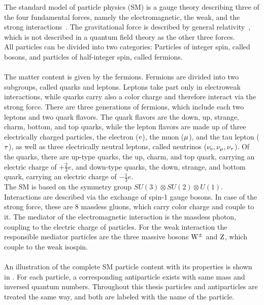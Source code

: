 The standard model of particle physics (SM) is a gauge theory describing three of the four fundamental forces, namely the electromagnetic, the weak, and the strong interactions~\cite{SM}. The gravitational force is described by general relativity~\cite{Einstein}, which is not described in a quantum field theory as the other three forces.\\
All particles can be divided into two categories: Particles of integer spin, called bosons, and particles of half-integer spin, called fermions.\\\\
The matter content is given by the fermions. Fermions are divided into two subgroups, called quarks and leptons. Leptons take part only in electroweak interactions, while quarks carry also a color charge and therefore interact via the strong force. There are three generations of fermions, which include each two leptons and two quark flavors. The quark flavors are the down, up, strange, charm, bottom, and top quarks, while the lepton flavors are made up of three electrically charged particles, the electron ($\mathrm{e}$), the muon ($\mu$), and the tau lepton ($\tau$), as well as three electrically neutral leptons, called neutrinos ($\nu_\mathrm{{e}},\nu_{\mu},\nu_{\tau}$).
Of the quarks, there are up-type quarks, the up, charm, and top quark, carrying an electric charge of $+\frac{2}{3}e$, and down-type quarks, the down, strange, and bottom quark, carrying an electric charge of $-\frac{1}{3}e$.\\
The SM is based on the symmetry group $SU(3)\otimes SU(2)\otimes U(1)$. Interactions are described via the exchange of spin-1 gauge bosons. In case of the strong force, these are 8 massless gluons, which carry color charge and couple to it. The mediator of the electromagnetic interaction is the massless photon, coupling to the electric charge of particles. For the weak interaction the responsible mediator particles are the three massive bosons $\mathrm{W}^\pm$ and $\mathrm{Z}$, which couple to the weak isospin.\\\\
An illustration of the complete SM particle content with its properties is shown in .
For each particle, a corresponding antiparticle exists with same mass and inversed quantum numbers. Throughout this thesis particles and antiparticles are treated the same way, and both are labeled with the name of the particle.\\

